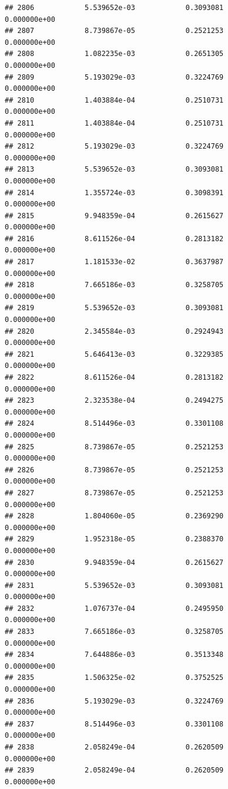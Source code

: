 \documentclass[
]{article}
\begin{document}
\begin{verbatim}
## 2806            5.539652e-03            0.3093081            0.000000e+00
## 2807            8.739867e-05            0.2521253            0.000000e+00
## 2808            1.082235e-03            0.2651305            0.000000e+00
## 2809            5.193029e-03            0.3224769            0.000000e+00
## 2810            1.403884e-04            0.2510731            0.000000e+00
## 2811            1.403884e-04            0.2510731            0.000000e+00
## 2812            5.193029e-03            0.3224769            0.000000e+00
## 2813            5.539652e-03            0.3093081            0.000000e+00
## 2814            1.355724e-03            0.3098391            0.000000e+00
## 2815            9.948359e-04            0.2615627            0.000000e+00
## 2816            8.611526e-04            0.2813182            0.000000e+00
## 2817            1.181533e-02            0.3637987            0.000000e+00
## 2818            7.665186e-03            0.3258705            0.000000e+00
## 2819            5.539652e-03            0.3093081            0.000000e+00
## 2820            2.345584e-03            0.2924943            0.000000e+00
## 2821            5.646413e-03            0.3229385            0.000000e+00
## 2822            8.611526e-04            0.2813182            0.000000e+00
## 2823            2.323538e-04            0.2494275            0.000000e+00
## 2824            8.514496e-03            0.3301108            0.000000e+00
## 2825            8.739867e-05            0.2521253            0.000000e+00
## 2826            8.739867e-05            0.2521253            0.000000e+00
## 2827            8.739867e-05            0.2521253            0.000000e+00
## 2828            1.804060e-05            0.2369290            0.000000e+00
## 2829            1.952318e-05            0.2388370            0.000000e+00
## 2830            9.948359e-04            0.2615627            0.000000e+00
## 2831            5.539652e-03            0.3093081            0.000000e+00
## 2832            1.076737e-04            0.2495950            0.000000e+00
## 2833            7.665186e-03            0.3258705            0.000000e+00
## 2834            7.644886e-03            0.3513348            0.000000e+00
## 2835            1.506325e-02            0.3752525            0.000000e+00
## 2836            5.193029e-03            0.3224769            0.000000e+00
## 2837            8.514496e-03            0.3301108            0.000000e+00
## 2838            2.058249e-04            0.2620509            0.000000e+00
## 2839            2.058249e-04            0.2620509            0.000000e+00

\end{verbatim}
\end{document}
